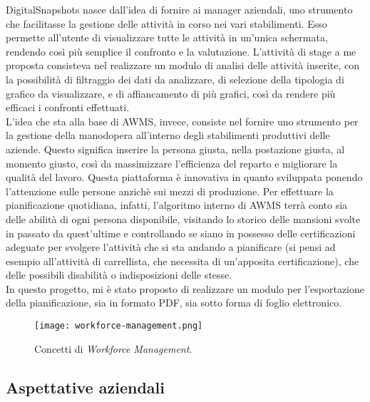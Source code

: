 DigitalSnapshots nasce dall'idea di fornire ai manager aziendali, uno strumento che facilitasse la gestione delle attività in corso nei vari stabilimenti. Esso permette all'utente di visualizzare tutte le attività in un'unica schermata, rendendo così più semplice il confronto e la valutazione. 
L'attività di stage a me proposta consisteva nel realizzare un modulo di analisi delle attività inserite, con la possibilità di filtraggio dei dati da analizzare, di selezione della tipologia di grafico da visualizzare, e di affiancamento di più grafici, così da rendere più efficaci i confronti effettuati. \\

L'idea che sta alla base di AWMS, invece, consiste nel fornire uno strumento per la gestione della manodopera all'interno degli stabilimenti produttivi delle aziende.
Questo significa inserire la persona giusta, nella postazione giusta, al momento giusto, così da massimizzare l'efficienza del reparto e migliorare la qualità del lavoro.
Questa piattaforma è innovativa in quanto sviluppata ponendo l'attenzione sulle persone anzichè sui mezzi di produzione. Per effettuare la pianificazione quotidiana, infatti, l'algoritmo interno di AWMS terrà conto sia delle abilità di ogni persona disponibile, visitando lo storico delle mansioni svolte in passato da quest'ultime e controllando se siano in possesso delle certificazioni adeguate per svolgere l'attività che si sta andando a pianificare (si pensi ad esempio all'attività di carrellista, che necessita di un'apposita certificazione), che delle possibili disabilità o indisposizioni delle stesse.\\
In questo progetto, mi è stato proposto di realizzare un modulo per l'esportazione della pianificazione, sia in formato PDF, sia sotto forma di foglio elettronico.

\begin{figure}[h]
\texttt{[image: workforce-management.png]}
\centering
\caption{Concetti di \textit{Workforce Management}.} 
\label{fig:workforce-management}
\end{figure}


\subsection{Aspettative aziendali}

